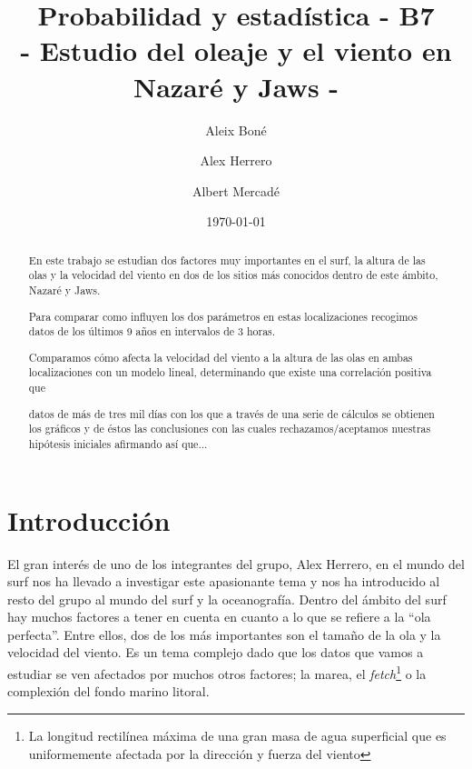 

\geometry{margin=1in}

\title{
   Probabilidad y estadística - B7 \\
   \large 
   - Estudio del oleaje y el viento en Nazaré y Jaws -
}
\author{
  Aleix Boné \and
  Alex Herrero \and
  Albert Mercadé
}
\date{
  \today
}


\maketitle

\begin{abstract}

En este trabajo se estudian dos factores muy importantes en el surf, la altura de las olas y la velocidad 
del viento en dos de los sitios más conocidos dentro de este ámbito, Nazaré y Jaws. 

Para comparar como influyen los dos parámetros en estas localizaciones recogimos datos de los últimos 9 años en
intervalos de 3 horas.

Comparamos cómo afecta la velocidad del viento a la altura de las olas en ambas localizaciones con un modelo
lineal, determinando que existe una correlación positiva
que 

datos de más de tres mil días con los que a través de una serie de cálculos se obtienen los gráficos y de 
éstos las conclusiones con las cuales rechazamos/aceptamos nuestras hipótesis iniciales afirmando así que...
\end{abstract}

\section{Introducción}%
\label{sec:introduccion}
El gran interés de uno de los integrantes del grupo, Alex Herrero, en el mundo del surf nos ha llevado a investigar este apasionante tema y nos ha introducido al resto del grupo al mundo del surf y la oceanografía. Dentro del ámbito del surf hay muchos factores a tener en cuenta en cuanto a lo que se refiere a la ``ola perfecta''. Entre ellos, dos de los más importantes son el tamaño de la ola y la velocidad del viento. Es un tema complejo dado que los datos que vamos a estudiar se ven afectados por muchos otros factores; la marea, el \textit{fetch}\footnote{La longitud rectilínea máxima de una gran masa de agua superficial que es uniformemente afectada por la dirección y fuerza del viento} o la complexión del fondo marino litoral.

